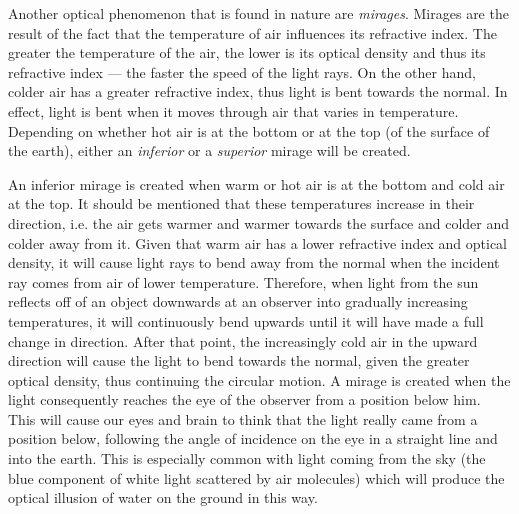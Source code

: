 \pagebreak


Another optical phenomenon that is found in nature are \emph{mirages}. Mirages are the result of the fact that the temperature of air influences its refractive index. The greater the temperature of the air, the lower is its optical density and thus its refractive index --- the faster the speed of the light rays. On the other hand, colder air has a greater refractive index, thus light is bent towards the normal. In effect, light is bent when it moves through air that varies in temperature. Depending on whether hot air is at the bottom or at the top (of the surface of the earth), either an \emph{inferior} or a \emph{superior} mirage will be created.


An inferior mirage is created when warm or hot air is at the bottom and cold air at the top. It should be mentioned that these temperatures increase in their direction, i.e. the air gets warmer and warmer towards the surface and colder and colder away from it. Given that warm air has a lower refractive index and optical density, it will cause light rays to bend away from the normal when the incident ray comes from air of lower temperature. Therefore, when light from the sun reflects off of an object downwards at an observer into gradually increasing temperatures, it will continuously bend upwards until it will have made a full change in direction. After that point, the increasingly cold air in the upward direction will cause the light to bend towards the normal, given the greater optical density, thus continuing the circular motion. A mirage is created when the light consequently reaches the eye of the observer from a position below him. This will cause our eyes and brain to think that the light really came from a position below, following the angle of incidence on the eye in a straight line and into the earth. This is especially common with light coming from the sky (the blue component of white light scattered by air molecules) which will produce the optical illusion of water on the ground in this way.

